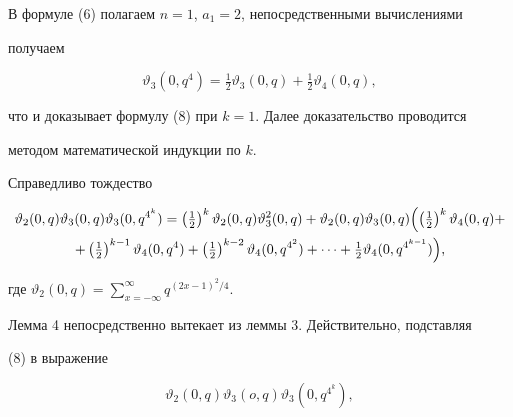 \begin{pf}


В формуле (6) полагаем $n=1$, $a_1=2$, непосредственными вычислениями


получаем


$$


\vartheta_3(0,q^4)=\tfrac{1}{2}\vartheta_3(0,q)+


\tfrac{1}{2}\vartheta_4(0,q),


$$


что и доказывает формулу (8) при $k=1$. Далее доказательство проводится


методом математической индукции по $k$.


\end{pf}





\begin{lem}


Справедливо тождество


\begin{multline}


\vartheta_2(0,q)\vartheta_3(0,q)\vartheta_3(0,q^{4^k})=


\left(\tfrac{1}{2}\right)^k\vartheta_2(0,q)


\vartheta^2_3(0,q)+\vartheta_2(0,q)\vartheta_3(0,q)


\Bigl(\left(\tfrac{1}{2}\right)^k\vartheta_4(0,q)+ \\


+\left(\tfrac{1}{2}\right)^{k-1}\vartheta_4(0,q^4)+


\left(\tfrac{1}{2}\right)^{k-2}\vartheta_4(0,q^{4^2})


+\dotsb+\tfrac{1}{2}\vartheta_4(0,q^{4^{k-1}})\Bigr),


\end{multline}


где $\vartheta_2(0,q)=


\sum\limits^\infty_{x=-\infty}q^{(2x-1)^2/4}$.


\end{lem}





Лемма 4 непосредственно вытекает из леммы 3. Действительно, подставляя


(8) в выражение


$$


\vartheta_2(0,q)\vartheta_3(o,q)\vartheta_3(0,q^{4^k}),


$$


